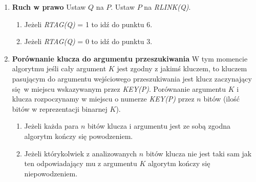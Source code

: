 \begin{enumerate}
		\item \textbf{Ruch w prawo} \newline
		Ustaw $Q$ na $P$. \newline
		Ustaw $P$ na \emph{RLINK(Q)}. 
		\begin{enumerate}
			\item Jeżeli \emph{RTAG(Q)} = 1 to idź do punktu 6.
			\item Jeżeli \emph{RTAG(Q)} = 0 to idź do punktu 3. 
		\end{enumerate}
		
		\item \textbf{Porównanie klucza do argumentu przeszukiwania} \newline
		W tym momencie algorytmu jeśli cały argument $K$ jest zgodny z jakimś kluczem, to kluczem pasującym do argumentu wejściowego przeszukiwania jest klucz zaczynający się w miejscu wskazywanym przez \emph{KEY(P)}. \newline
		Porównanie argumentu $K$ i klucza rozpoczynamy w miejscu o numerze \emph{KEY(P)} przez $n$ bitów (ilość bitów w reprezentacji binarnej $K$).
		\begin{enumerate}
			\item Jeżeli każda para $n$ bitów klucza i argumentu jest ze sobą zgodna algorytm kończy się powodzeniem.
			\item Jeżeli którykolwiek z analizowanych $n$ bitów klucza nie jest taki sam jak ten odpowiadający mu z argumentu $K$ algorytm kończy się niepowodzeniem.
		\end{enumerate}
	\end{enumerate}
	
